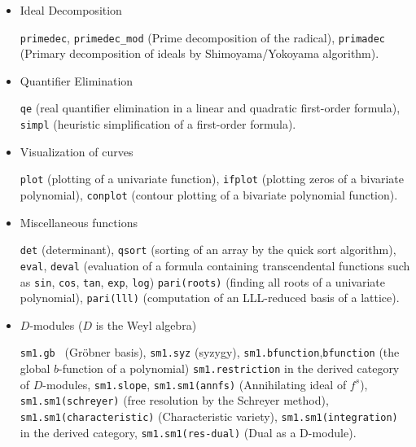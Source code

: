 \documentclass[12pt]{article}
\begin{document}
\begin{itemize}
{\tt dp\_gr\_main }, {\tt nd\_gr\_trace} (Groebner basis computation of a polynomial ideal
over the rationals by the trace lifting),
{\tt dp\_gr\_mod\_main }, {\tt nd\_gr} (Groebner basis over small finite fields),
{\tt tolex } (Modular change of ordering for a zero-dimensional ideal),
{\tt tolex\_gsl } (Modular rational univariate representation
for a zero-dimensional ideal),
{\tt dp\_f4\_main}, {\tt dp\_f4\_mod\_main}, {\tt nd\_f4} 
($F_4$ over the rationals and small finite fields).

\item Ideal Decomposition

{\tt primedec}, {\tt primedec\_mod} (Prime decomposition of the radical),
{\tt primadec} (Primary decomposition of ideals by Shimoyama/Yokoyama algorithm).

\item Quantifier Elimination

{\tt qe} (real quantifier elimination in a linear and
quadratic first-order formula),
{\tt simpl} (heuristic simplification of a first-order formula).

\item Visualization of curves

{\tt plot} (plotting of a univariate function),
{\tt ifplot} (plotting zeros of a bivariate polynomial),
{\tt conplot} (contour plotting of a bivariate polynomial function).

\item Miscellaneous functions

{\tt det} (determinant),
{\tt qsort} (sorting of an array by the quick sort algorithm),
{\tt eval}, {\tt deval} (evaluation of a formula containing transcendental functions
such as
{\tt sin}, {\tt cos}, {\tt tan}, {\tt exp},
{\tt log})
{\tt pari(roots)} (finding all roots of a univariate polynomial),
{\tt pari(lll)} (computation of an LLL-reduced basis of a lattice).

\item $D$-modules ($D$ is the Weyl algebra)

{\tt sm1.gb } (Gr\"obner basis),
{\tt sm1.syz} (syzygy),
{\tt sm1.bfunction},{\tt bfunction} (the global $b$-function of a polynomial)
{\tt sm1.restriction} in the derived category of $D$-modules,
{\tt sm1.slope},
{\tt sm1.sm1(annfs)} (Annihilating ideal of $f^s$),
{\tt sm1.sm1(schreyer)} (free resolution by the Schreyer method),
{\tt sm1.sm1(characteristic)} (Characteristic variety),
{\tt sm1.sm1(integration)} in the derived category,
{\tt sm1.sm1(res-dual)} (Dual as a D-module).


\end{itemize}
\end{document}

